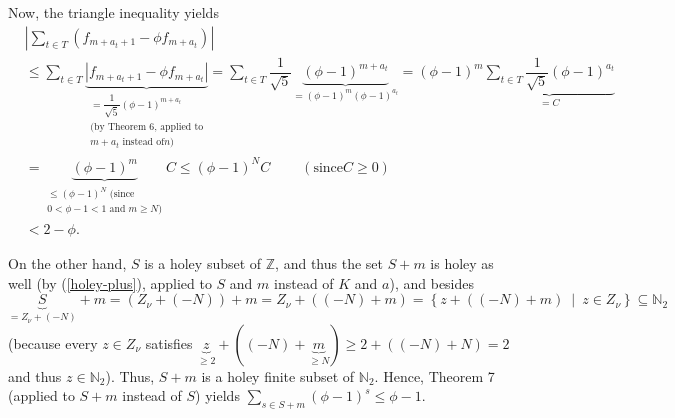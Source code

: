 \documentclass[12pt,final,notitlepage,onecolumn]{article}%
\begin{document}
Now, the triangle inequality yields%
\begin{align*}
&  \left\vert \sum\limits_{t\in T}\left(  f_{m+a_{t}+1}-\phi f_{m+a_{t}%
}\right)  \right\vert \\
&  \leq\sum\limits_{t\in T}\underbrace{\left\vert f_{m+a_{t}+1}-\phi
f_{m+a_{t}}\right\vert }_{\substack{=\dfrac{1}{\sqrt{5}}\left(  \phi-1\right)
^{m+a_{t}}\\\text{(by Theorem 6, applied to}\\m+a_{t}\text{ instead of
}n\text{)}}}=\sum\limits_{t\in T}\dfrac{1}{\sqrt{5}}\underbrace{\left(
\phi-1\right)  ^{m+a_{t}}}_{=\left(  \phi-1\right)  ^{m}\left(  \phi-1\right)
^{a_{t}}}=\left(  \phi-1\right)  ^{m}\underbrace{\sum\limits_{t\in T}\dfrac
{1}{\sqrt{5}}\left(  \phi-1\right)  ^{a_{t}}}_{=C}\\
&  =\underbrace{\left(  \phi-1\right)  ^{m}}_{\substack{\leq\left(
\phi-1\right)  ^{N}\text{ (since}\\0<\phi-1<1\text{ and }m\geq N\text{)}%
}}C\leq\left(  \phi-1\right)  ^{N}C\ \ \ \ \ \ \ \ \ \ \left(  \text{since
}C\geq0\right) \\
&  <2-\phi.
\end{align*}


On the other hand, $S$ is a holey subset of $\mathbb{Z}$, and thus the set
$S+m$ is holey as well (by (\ref{holey-plus}), applied to $S$ and $m$ instead
of $K$ and $a$), and besides $\underbrace{S}_{=Z_{\nu}+\left(  -N\right)
}+m=\left(  Z_{\nu}+\left(  -N\right)  \right)  +m=Z_{\nu}+\left(  \left(
-N\right)  +m\right)  =\left\{  z+\left(  \left(  -N\right)  +m\right)
\ \mid\ z\in Z_{\nu}\right\}  \subseteq\mathbb{N}_{2}$ (because every $z\in
Z_{\nu}$ satisfies $\underbrace{z}_{\geq2}+\left(  \left(  -N\right)
+\underbrace{m}_{\geq N}\right)  \geq2+\left(  \left(  -N\right)  +N\right)
=2$ and thus $z\in\mathbb{N}_{2}$). Thus, $S+m$ is a holey finite subset of
$\mathbb{N}_{2}$. Hence, Theorem 7 (applied to $S+m$ instead of $S$) yields
$\sum\limits_{s\in S+m}\left(  \phi-1\right)  ^{s}\leq\phi-1$.
\end{document}
